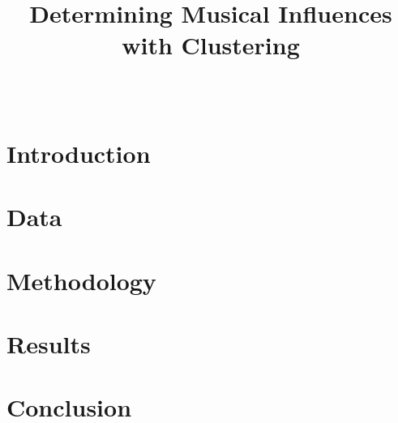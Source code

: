 \documentclass[12pt]{article}
\title{Determining Musical Influences with Clustering}
\author{\names \\
        \class }
\begin{document}
    \begingroup
        \let\newpage\relax%
        \maketitle
    \endgroup

    \section{Introduction}
        
    \section{Data}
        
    \section{Methodology}
        
    \section{Results}
        
    \section{Conclusion}
        
   
\end{document}
